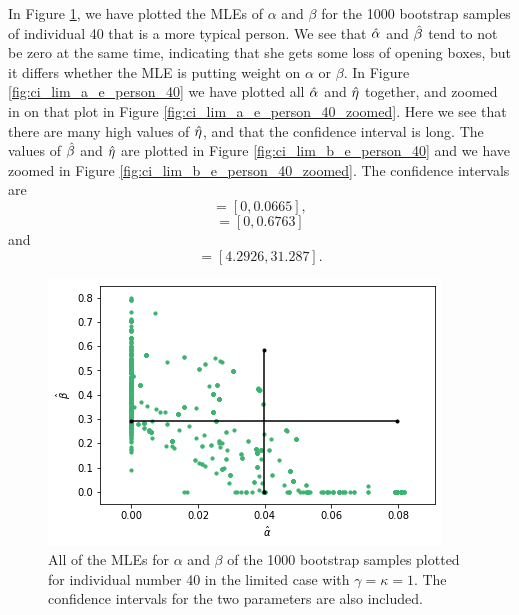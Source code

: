In Figure \ref{fig:ci_lim_a_b_person40}, we have plotted the MLEs of $\alpha$ and $\beta$ for the 1000 bootstrap samples of individual 40 that is a more typical person. We see that $\hat{\alpha}$ and $\hat{\beta}$ tend to not be zero at the same time, indicating that she gets some loss of opening boxes, but it differs whether the MLE is putting weight on $\alpha$ or $\beta$. In Figure \ref{fig:ci_lim_a_e_person_40} we have plotted all $\hat{\alpha}$ and $\hat{\eta}$ together, and zoomed in on that plot in Figure \ref{fig:ci_lim_a_e_person_40_zoomed}. Here we see that there are many high values of $\hat{\eta}$, and that the confidence interval is long. The values of $\hat{\beta}$ and $\hat{\eta}$ are plotted in Figure \ref{fig:ci_lim_b_e_person_40} and we have zoomed in Figure \ref{fig:ci_lim_b_e_person_40_zoomed}. 
The confidence intervals are 
\begin{equation*}
    [\hat{\alpha}^{*(5)}_{1000},\hat{\alpha}^{*(95)}_{1000}] = [0,0.0665],
\end{equation*}
\begin{equation*}
    [\hb^{*(5)}_{1000},\hb^{*(95)}_{1000}] = [0,0.6763]
\end{equation*}
and
\begin{equation*}
    [\hat{\eta}^{*(5)}_{1000},\hat{\eta}^{*(95)}_{1000}] = [4.2926,31.287].
\end{equation*}
\begin{figure}
    \centering
    \includegraphics[scale=0.5]{pictures/ci_lim_a_b_person40.png}
    \caption[MLEs for $\alpha$ and $\beta$ for bootstrap samples individual 40, limited]{All of the MLEs for $\alpha$ and $\beta$ of the 1000 bootstrap samples plotted for individual number 40 in the limited case with $\gamma=\kappa=1$. The confidence intervals for the two parameters are also included.}
    \label{fig:ci_lim_a_b_person40}
\end{figure}
